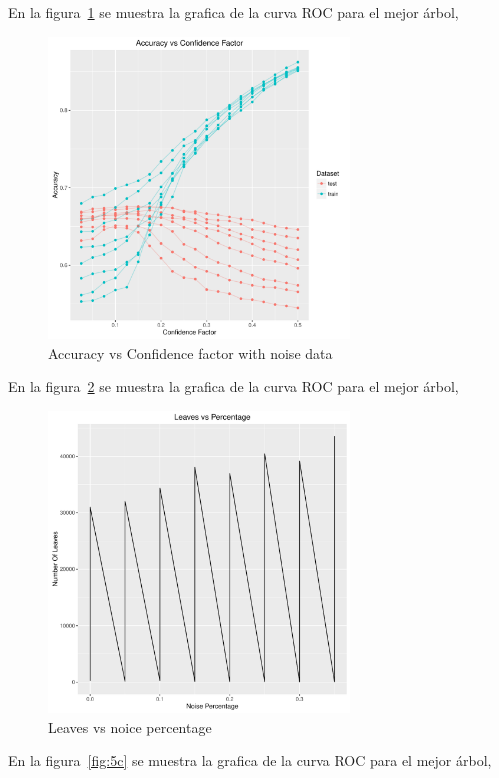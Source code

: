 En la figura~\ref{fig:5a} se muestra la grafica de la curva ROC para el mejor árbol,

\begin{figure}
  \centering
  \includegraphics[width = 8cm]{5a.pdf}
  \caption{Accuracy vs Confidence factor with noise data}
  \label{fig:5a}
\end{figure}

En la figura~\ref{fig:5b} se muestra la grafica de la curva ROC para el mejor árbol,

\begin{figure}
  \centering
  \includegraphics[width = 8cm]{5b.pdf}
  \caption{Leaves vs noice percentage}
  \label{fig:5b}
\end{figure}

En la figura~\ref{fig:5c} se muestra la grafica de la curva ROC para el mejor árbol,

